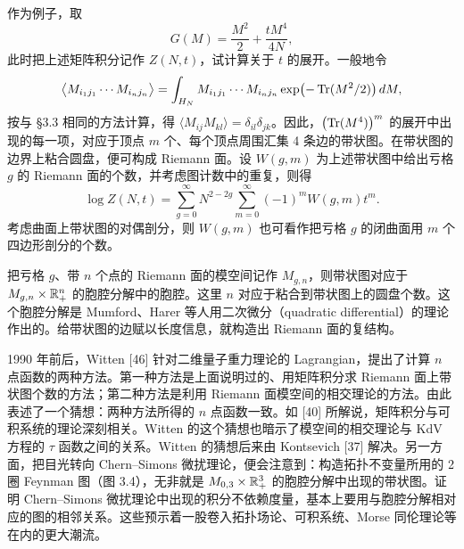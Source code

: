 作为例子，取
\[
  G(M)=\frac{M^{2}}{2}+\frac{tM^{4}}{4N},
\]
此时把上述矩阵积分记作 $Z(N,t)$，试计算关于 $t$ 的展开。一般地令
\[
  \bigl\langle M_{i_{1}j_{1}}\cdots M_{i_{n}j_{n}}\bigr\rangle
  =\int_{H_N}M_{i_{1}j_{1}}\cdots M_{i_{n}j_{n}}
  \exp\bigl(-\operatorname{Tr}(M^{2}/2)\bigr)\,dM,
\]
按与 §3.3 相同的方法计算，得 $\langle M_{ij}M_{kl}\rangle=\delta_{il}\delta_{jk}$。因此，$\bigl(\operatorname{Tr}(M^{4})\bigr)^{m}$ 的展开中出现的每一项，对应于顶点 $m$ 个、每个顶点周围汇集 4 条边的带状图。在带状图的边界上粘合圆盘，便可构成 Riemann 面。设 $W(g,m)$ 为上述带状图中给出亏格 $g$ 的 Riemann 面的个数，并考虑图计数中的重复，则得
\[
  \log Z(N,t)=\sum_{g=0}^{\infty}N^{2-2g}\sum_{m=0}^{\infty}(-1)^{m}W(g,m)t^{m}.
\]
考虑曲面上带状图的对偶剖分，则 $W(g,m)$ 也可看作把亏格 $g$ 的闭曲面用 $m$ 个四边形剖分的个数。


把亏格 $g$、带 $n$ 个点的 Riemann 面的模空间记作 $M_{g,n}$，则带状图对应于 $M_{g,n}\times\mathbb{R}_{+}^{n}$ 的胞腔分解中的胞腔。这里 $n$ 对应于粘合到带状图上的圆盘个数。这个胞腔分解是 Mumford、Harer 等人用二次微分（quadratic differential）的理论作出的。给带状图的边赋以长度信息，就构造出 Riemann 面的复结构。


1990 年前后，Witten [46] 针对二维量子重力理论的 Lagrangian，提出了计算 $n$ 点函数的两种方法。第一种方法是上面说明过的、用矩阵积分求 Riemann 面上带状图个数的方法；第二种方法是利用 Riemann 面模空间的相交理论的方法。由此表述了一个猜想：两种方法所得的 $n$ 点函数一致。如 [40] 所解说，矩阵积分与可积系统的理论深刻相关。Witten 的这个猜想也暗示了模空间的相交理论与 KdV 方程的 $\tau$ 函数之间的关系。Witten 的猜想后来由 Kontsevich [37] 解决。另一方面，把目光转向 Chern--Simons 微扰理论，便会注意到：构造拓扑不变量所用的 2 圈 Feynman 图（图 3.4），无非就是 $M_{0,3}\times\mathbb{R}_{+}^{3}$ 的胞腔分解中出现的带状图。证明 Chern--Simons 微扰理论中出现的积分不依赖度量，基本上要用与胞腔分解相对应的图的相邻关系。这些预示着一股卷入拓扑场论、可积系统、Morse 同伦理论等在内的更大潮流。

